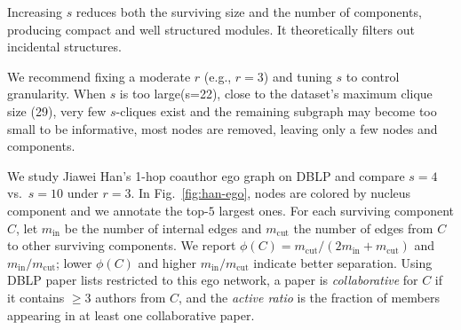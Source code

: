 Increasing $s$ reduces both the surviving size and the number of components, producing compact and well structured modules. It theoretically filters out incidental structures.


We recommend fixing a moderate $r$ (e.g., $r{=}3$) and tuning $s$ to control granularity.
When $s$ is too large(s=22), close to the dataset's maximum clique size (29), very few $s$-cliques exist and the remaining subgraph may become too small to be informative, most nodes are removed, leaving only a few nodes and components.






\label{sec:case-study-han}
We study Jiawei Han's 1-hop coauthor ego graph on DBLP and compare $s{=}4$ vs.\ $s{=}10$ under $r{=}3$.
In Fig.~\ref{fig:han-ego}, nodes are colored by nucleus component and we annotate the top-$5$ largest ones.
For each surviving component $C$, let $m_{\mathrm{in}}$ be the number of internal edges and $m_{\mathrm{cut}}$ the number of edges from $C$ to other surviving components.
We report $\phi(C)=m_{\mathrm{cut}}/(2m_{\mathrm{in}}+m_{\mathrm{cut}})$ and $m_{\mathrm{in}}/m_{\mathrm{cut}}$; lower $\phi(C)$ and higher $m_{\mathrm{in}}/m_{\mathrm{cut}}$ indicate better separation.
Using DBLP paper lists restricted to this ego network, a paper is \emph{collaborative} for $C$ if it contains $\ge3$ authors from $C$, and the \emph{active ratio} is the fraction of members appearing in at least one collaborative paper.


